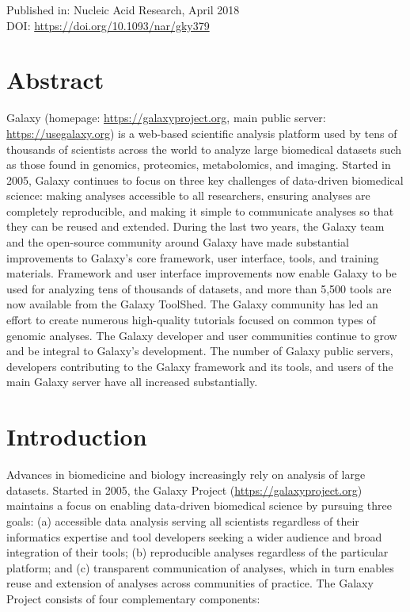Published in: Nucleic Acid Research, April 2018 \\
DOI: \url{https://doi.org/10.1093/nar/gky379} \\

\section*{Abstract}
Galaxy (homepage: \url{https://galaxyproject.org}, main public server: \url{https://usegalaxy.org}) is a web-based scientific analysis platform used by tens of thousands of scientists across the world to analyze large biomedical datasets such as those found in genomics, proteomics, metabolomics, and imaging. Started in 2005, Galaxy continues to focus on three key challenges of data-driven biomedical science: making analyses accessible to all researchers, ensuring analyses are completely reproducible, and making it simple to communicate analyses so that they can be reused and extended. During the last two years, the Galaxy team and the open-source community around Galaxy have made substantial improvements to Galaxy’s core framework, user interface, tools, and training materials. Framework and user interface improvements now enable Galaxy to be used for analyzing tens of thousands of datasets, and more than 5,500 tools are now available from the Galaxy ToolShed. The Galaxy community has led an effort to create numerous high-quality tutorials focused on common types of genomic analyses. The Galaxy developer and user communities continue to grow and be integral to Galaxy’s development. The number of Galaxy public servers, developers contributing to the Galaxy framework and its tools, and users of the main Galaxy server have all increased substantially.


\section*{Introduction}
Advances in biomedicine and biology increasingly rely on analysis of large datasets. Started in 2005, the Galaxy Project (\url{https://galaxyproject.org})~\cite{giardine2005galaxy,blankenberg2007framework,afgan2016galaxy} maintains a focus on enabling data-driven biomedical science by pursuing three goals: (a) accessible data analysis serving all scientists regardless of their informatics expertise and tool developers seeking a wider audience and broad integration of their tools; (b) reproducible analyses regardless of the particular platform; and (c) transparent communication of analyses, which in turn enables reuse and extension of analyses across communities of practice. The Galaxy Project consists of four complementary components:

